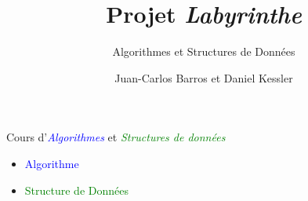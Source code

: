 \documentclass[]{beamer}
\title{Projet \textit{Labyrinthe}}
\subtitle{Algorithmes et Structures de Données}
\author{Juan-Carlos Barros et Daniel Kessler}
\begin{document}
\begin{frame}
  \titlepage
\end{frame} %

\begin{frame}
  Cours d'\textit{\textcolor<1>{blue}{Algorithmes}}
  et \textit{\textcolor<1>{green}{Structures de données}}
  \par\bigskip
  \par
  \begin{minipage}{.65\linewidth}
  \begin{itemize}
  \item<2->\textcolor{blue}{Algorithme}\par{}
  \item<2->\textcolor{green}{Structure de Données}%
  \par{}
  \end{itemize}
  \end{minipage}
  \begin{minipage}{.3\linewidth}
  \end{minipage}
\end{frame} %
\end{document}
